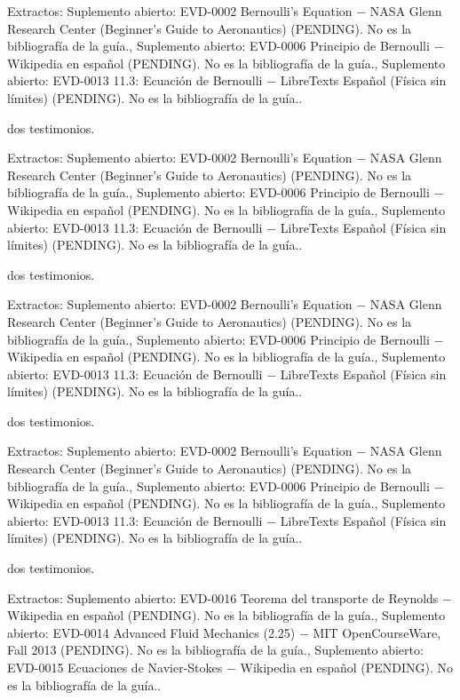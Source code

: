 \documentclass{book}
\begin{document}
\noindent Extractos: Suplemento abierto: EVD-0002 Bernoulli's Equation \(-\) NASA Glenn Research Center (Beginner's Guide to Aeronautics) (PENDING). No es la bibliografía de la guía., Suplemento abierto: EVD-0006 Principio de Bernoulli \(-\) Wikipedia en español (PENDING). No es la bibliografía de la guía., Suplemento abierto: EVD-0013 11.3: Ecuación de Bernoulli \(-\) LibreTexts Español (Física sin límites) (PENDING). No es la bibliografía de la guía..

\noindent dos testimonios.

\noindent Extractos: Suplemento abierto: EVD-0002 Bernoulli's Equation \(-\) NASA Glenn Research Center (Beginner's Guide to Aeronautics) (PENDING). No es la bibliografía de la guía., Suplemento abierto: EVD-0006 Principio de Bernoulli \(-\) Wikipedia en español (PENDING). No es la bibliografía de la guía., Suplemento abierto: EVD-0013 11.3: Ecuación de Bernoulli \(-\) LibreTexts Español (Física sin límites) (PENDING). No es la bibliografía de la guía..

\noindent dos testimonios.

\noindent Extractos: Suplemento abierto: EVD-0002 Bernoulli's Equation \(-\) NASA Glenn Research Center (Beginner's Guide to Aeronautics) (PENDING). No es la bibliografía de la guía., Suplemento abierto: EVD-0006 Principio de Bernoulli \(-\) Wikipedia en español (PENDING). No es la bibliografía de la guía., Suplemento abierto: EVD-0013 11.3: Ecuación de Bernoulli \(-\) LibreTexts Español (Física sin límites) (PENDING). No es la bibliografía de la guía..

\noindent dos testimonios.

\noindent Extractos: Suplemento abierto: EVD-0002 Bernoulli's Equation \(-\) NASA Glenn Research Center (Beginner's Guide to Aeronautics) (PENDING). No es la bibliografía de la guía., Suplemento abierto: EVD-0006 Principio de Bernoulli \(-\) Wikipedia en español (PENDING). No es la bibliografía de la guía., Suplemento abierto: EVD-0013 11.3: Ecuación de Bernoulli \(-\) LibreTexts Español (Física sin límites) (PENDING). No es la bibliografía de la guía..

\noindent dos testimonios.

\noindent Extractos: Suplemento abierto: EVD-0016 Teorema del transporte de Reynolds \(-\) Wikipedia en español (PENDING). No es la bibliografía de la guía., Suplemento abierto: EVD-0014 Advanced Fluid Mechanics (2.25) \(-\) MIT OpenCourseWare, Fall 2013 (PENDING). No es la bibliografía de la guía., Suplemento abierto: EVD-0015 Ecuaciones de Navier-Stokes \(-\) Wikipedia en español (PENDING). No es la bibliografía de la guía..
\end{document}
